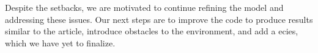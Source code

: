 \documentclass[9pt]{pnas-new}
\begin{document}
Despite the setbacks, we are motivated to continue refining the model and addressing these issues. 
Our next steps are to improve the code to produce results similar to the article, introduce obstacles to the environment, and add a ecies, which we have yet to finalize.

\showacknow %


\begin{multicols}{2}
\end{multicols}
\end{document}
